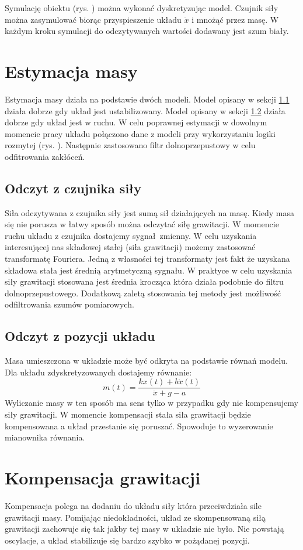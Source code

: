 \documentclass[a4paper]{article}
\begin{document}
Symulację obiektu (rys. ) można wykonać dyskretyzując model. Czujnik siły można zasymulować biorąc przyspieszenie układu $\ddot{x}$ i mnożąć przez masę. W każdym kroku symulacji do odczytywanych wartości dodawany jest szum biały.

\section{Estymacja masy}
Estymacja masy działa na podstawie dwóch modeli. Model opisany w sekcji \ref{fs} działa dobrze gdy układ jest ustabilizowany. Model opisany w sekcji \ref{pos} działa dobrze gdy układ jest w ruchu. W celu poprawnej estymacji w dowolnym momencie pracy układu połączono dane z modeli przy wykorzystaniu logiki rozmytej (rys. ). Następnie zastosowano filtr dolnoprzepustowy w celu odfitrowania zakłóceń.
  
\subsection{Odczyt z czujnika siły}
\label{fs}
Siła odczytywana z czujnika siły jest sumą sił działających na masę. Kiedy masa się nie porusza w łatwy sposób można odczytać siłę grawitacji. W momencie ruchu układu z czujnika dostajemy sygnał zmienny. W celu uzyskania interesującej nas składowej stałej (siła grawitacji) możemy zastosować transformatę Fouriera. Jedną z własności tej transformaty jest fakt że uzyskana składowa stała jest średnią arytmetyczną sygnału. W praktyce w celu uzyskania siły grawitacji stosowana jest średnia krocząca która działa podobnie do filtru dolnoprzepustowego. Dodatkową zaletą stosowania tej metody jest możliwość odfiltrowania szumów pomiarowych.

\subsection{Odczyt z pozycji układu}
\label{pos}
Masa umieszczona w układzie może być odkryta na podstawie równań modelu. Dla układu zdyskretyzowanych dostajemy równanie:
\[ m(t) = \frac{kx(t) + b\dot{x}(t)}{\ddot{x}+g-a}\]
Wyliczanie masy w ten sposób ma sens tylko w przypadku gdy nie kompensujemy siły grawitacji. W momencie kompensacji stała siła grawitacji będzie kompensowana a układ przestanie się poruszać. Spowoduje to wyzerowanie mianownika równania.

\section{Kompensacja grawitacji}
Kompensacja polega na dodaniu do układu siły która przeciwdziała sile grawitacji masy. Pomijając niedokładności, układ ze skompensowaną siłą grawitacji zachowuje się tak jakby tej masy w układzie nie było. Nie powstają oscylacje, a układ stabilizuje się bardzo szybko w pożądanej pozycji.
\end{document}
